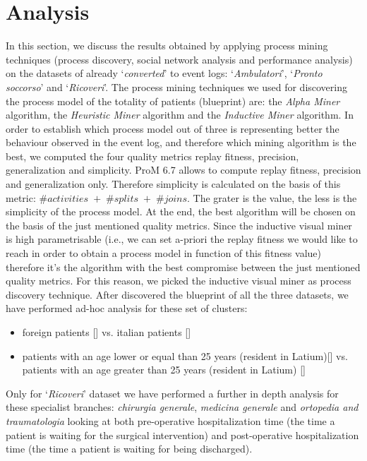\section{Analysis} \label{analysis}
In this section, we discuss the results obtained by applying process mining techniques (process discovery, social network analysis and performance analysis) on the datasets of \hospital already `\textit{converted}' to event logs: `\textit{Ambulatori}', `\textit{Pronto soccorso}' and `\textit{Ricoveri}'. The process mining techniques we used for discovering the process model of the totality of patients (blueprint) are: the \textit{Alpha Miner} algorithm, the \textit{Heuristic Miner} algorithm and the \textit{Inductive Miner} algorithm. In order to establish which process model out of three is representing better the behaviour observed in the event log, and therefore which mining algorithm is the best, we computed the four quality metrics replay fitness, precision, generalization and simplicity. ProM 6.7 allows to compute replay fitness, precision and generalization only. Therefore simplicity is calculated on the basis of this metric: \#$activities \;+\;$\#$splits \;+\; $\#$joins$. The grater is the value, the less is the simplicity of the process model. At the end, the best algorithm will be chosen on the basis of the just mentioned quality metrics. Since the inductive visual miner is high parametrisable (i.e., we can set a-priori the replay fitness we would like to reach in order to obtain a process model in function of this fitness value) therefore it's the algorithm with the best compromise between the just mentioned quality metrics. For this reason, we picked the inductive visual miner as process discovery technique. After discovered the blueprint of all the three datasets, we have performed ad-hoc analysis for these set of clusters:
\begin{itemize}
\item foreign patients [] vs. italian patients []
\item patients with an age lower or equal than 25 years (resident in Latium)[] vs. patients with an age greater than 25 years (resident in Latium) []
\end{itemize}
Only for `\textit{Ricoveri}' dataset we have performed a further in depth analysis for these specialist branches: \textit{chirurgia generale}, \textit{medicina generale} and \textit{ortopedia and traumatologia} looking at both pre-operative hospitalization time (the time a patient is waiting for the surgical intervention) and post-operative hospitalization time (the time a patient is waiting for being discharged).
\clearpage
